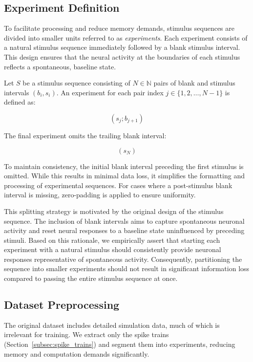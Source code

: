 \subsection{Experiment Definition}
\label{subsec:experiment}
To facilitate processing and reduce memory demands, stimulus sequences are divided into smaller units referred to as \emph{experiments}. Each experiment consists of a natural stimulus sequence immediately followed by a blank stimulus interval. This design ensures that the neural activity at the boundaries of each stimulus reflects a spontaneous, baseline state.

\begin{defn}[Experiment]
    Let $S$ be a stimulus sequence consisting of $N \in \mathbb{N}$ pairs of blank and stimulus intervals $(b_i, s_i)$. An experiment for each pair index $j \in \{1, 2, \dots, N-1\}$ is defined as:

    $$
    \left(s_j; b_{j+1}\right)
    $$

    The final experiment omits the trailing blank interval:

    $$
    \left(s_N\right)
    $$
\end{defn}
\label{def:experiment}

To maintain consistency, the initial blank interval preceding the first stimulus is omitted. While this results in minimal data loss, it simplifies the formatting and processing of experimental sequences. For cases where a post-stimulus blank interval is missing, zero-padding is applied to ensure uniformity.

This splitting strategy is motivated by the original design of the stimulus sequence. The inclusion of blank intervals aims to capture spontaneous neuronal activity and reset neural responses to a baseline state uninfluenced by preceding stimuli. Based on this rationale, we empirically assert that starting each experiment with a natural stimulus should consistently provide neuronal responses representative of spontaneous activity. Consequently, partitioning the sequence into smaller experiments should not result in significant information loss compared to passing the entire stimulus sequence at once.

\subsection{Dataset Preprocessing}
\label{subsec:dataset_preprocess}
The original dataset includes detailed simulation data, much of which is irrelevant for training. We extract only the spike trains (Section~\ref{subsec:spike_trains}) and segment them into experiments, reducing memory and computation demands significantly.

